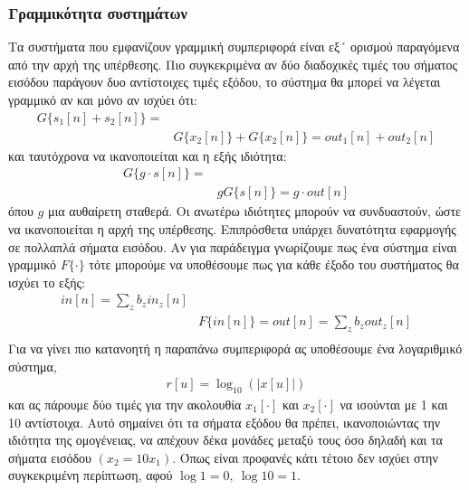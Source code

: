 \documentclass[breaklines=true, 12pt]{article}
\begin{document}
\subsubsection{Γραμμικότητα συστημάτων}
\label{sec:org1ac0966}
Τα συστήματα που εμφανίζουν γραμμική συμπεριφορά είναι εξ´ ορισμού
παραγόμενα από την αρχή της υπέρθεσης. Πιο συγκεκριμένα αν δύο διαδοχικές
τιμές του σήματος εισόδου παράγουν δυο αντίστοιχες τιμές εξόδου, το σύστημα
θα μπορεί να λέγεται γραμμικό αν και μόνο αν ισχύει ότι:
\begin{equation}
\begin{align}
G\{s_{1}[n]+s_{2}[n]\} = \\
&G\{x_{2}[n]\}+G\{x_{2}[n]\} = out_{1}[n] + out_{2}[n]
\end{align}
\end{equation}
και ταυτόχρονα να ικανοποιείται και η εξής ιδιότητα:
\begin{equation}
\begin{align}
G\{g \cdot s[n]\} = \\
&gG\{s[n]\} = g\cdot out[n]
\end{align}
\end{equation}
όπου \(g\) μια αυθαίρετη σταθερά. Οι ανωτέρω ιδιότητες μπορούν να συνδυαστούν,
ώστε να ικανοποιείται η αρχή της υπέρθεσης. Επιπρόσθετα υπάρχει δυνατότητα
εφαρμογής σε πολλαπλά σήματα εισόδου. Αν για παράδειγμα γνωρίζουμε πως ένα
σύστημα είναι γραμμικό \(F\{\cdot\}\) τότε μπορούμε να υποθέσουμε πως για κάθε έξοδο
του συστήματος θα ισχύει το εξής:
\begin{equation}
\begin{align}
in[n] = \sum_{z}b_{z}in_{z}[n] \\
&F\{in[n]\} = out[n] = \sum_{z}b_{z}out_{z}[n] \\
\end{align}
\end{equation}
Για να γίνει πιο κατανοητή η παραπάνω συμπεριφορά ας υποθέσουμε ένα λογαριθμικό
σύστημα,
\begin{equation}
\begin{align}
r[u] = \log_{10}(|x[u]|)
\end{align}
\end{equation}
και ας πάρουμε δύο τιμές για την ακολουθία \(x_{1}[\cdot]\) και \(x_{2}[\cdot]\) να ισούνται με 1 και 10
αντίστοιχα. Αυτό σημαίνει ότι τα σήματα εξόδου θα πρέπει, ικανοποιώντας την
ιδιότητα της ομογένειας, να απέχουν δέκα μονάδες μεταξύ τους όσο δηλαδή και
τα σήματα εισόδου \((x_{2}=10x_{1})\). Όπως είναι προφανές κάτι τέτοιο δεν ισχύει
στην συγκεκριμένη περίπτωση, αφού \(\log1=0,\ \log10=1\).
\end{document}
